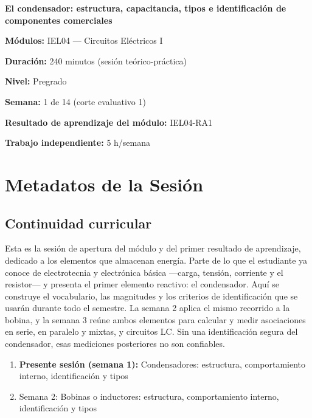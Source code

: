 \documentclass[11pt,letterpaper]{article}
\begin{document}
\begin{cabecera}
{\color{iubyellow}\Large\bfseries El condensador: estructura, capacitancia, tipos e identificación de componentes comerciales\par}
\vspace{0.6em}
\small
\textbf{\color{iubyellow}Módulos:} IEL04 --- Circuitos Eléctricos I\par
\textbf{\color{iubyellow}Duración:} 240 minutos (sesión teórico-práctica)\par
\textbf{\color{iubyellow}Nivel:} Pregrado\par
\textbf{\color{iubyellow}Semana:} 1 de 14 (corte evaluativo 1)\par
\textbf{\color{iubyellow}Resultado de aprendizaje del módulo:} IEL04-RA1\par
\textbf{\color{iubyellow}Trabajo independiente:} 5 h/semana\par
\end{cabecera}

\section{Metadatos de la Sesión}

\subsection{Continuidad curricular}

Esta es la sesión de apertura del módulo y del primer resultado de aprendizaje, dedicado a los elementos que almacenan energía. Parte de lo que el estudiante ya conoce de electrotecnia y electrónica básica ---carga, tensión, corriente y el resistor--- y presenta el primer elemento reactivo: el condensador. Aquí se construye el vocabulario, las magnitudes y los criterios de identificación que se usarán durante todo el semestre. La semana 2 aplica el mismo recorrido a la bobina, y la semana 3 reúne ambos elementos para calcular y medir asociaciones en serie, en paralelo y mixtas, y circuitos LC. Sin una identificación segura del condensador, esas mediciones posteriores no son confiables.

\begin{enumerate}
  \item \textbf{Presente sesión (semana 1):} Condensadores: estructura, comportamiento interno, identificación y tipos
  \item Semana 2: Bobinas o inductores: estructura, comportamiento interno, identificación y tipos
\end{enumerate}
\end{document}
